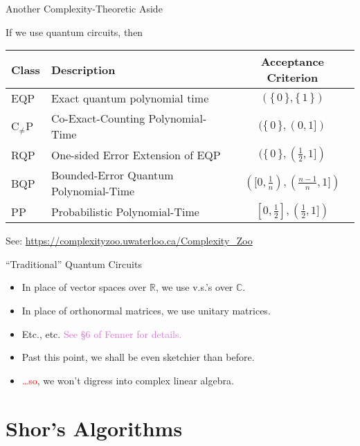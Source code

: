 \documentclass[table,serif,ignorenonframetext,xcolor=dvipsnames]{beamer}
\newcommand{\vertt}[1]{{\textcolor{PineGreen}{#1}}}
\newcommand{\rouge}[1]{{\textcolor{red}{#1}}}
\newcommand{\orchid}[1]{\textcolor{Orchid}{#1}}
\newcommand{\Math}[1]{\ensuremath{#1}}
\newcommand{\Quad}[1]{\hspace*{#1em}}
\newcommand{\set}[1]{\{\,#1\,\}}
\begin{document}
\begin{frame}{Another Complexity-Theoretic Aside}\small

If we use quantum circuits, then 
\begin{center}\begin{tabular}{l|l|c}
{Class} & Description & {Acceptance Criterion } \\ \hline
EQP 
  & {\footnotesize Exact quantum polynomial time} 
  & $(\set{0},\set{1})$ 
  \\
C$_{\not=}$P
  & {\footnotesize Co-Exact-Counting Polynomial-Time} 
  & $(\set{0},(0,1])$ 
  \\
RQP
  & {\footnotesize One-sided Error Extension of EQP} 
  & $(\set{0},(\frac12,1])$
  \\
BQP 
  & {\footnotesize Bounded-Error Quantum Polynomial-Time} 
  & $([0,\frac1n),(\frac{n-1}n,1])$
  \\
PP 
  & {\footnotesize Probabilistic Polynomial-Time} 
  & $[0,\frac12],(\frac12,1])$
\end{tabular}\end{center}

\bigskip
\begin{center}
See: \textcolor{RoyalBlue}{\url{https://complexityzoo.uwaterloo.ca/Complexity_Zoo}}
\end{center}
\end{frame}
\begin{frame}{``Traditional'' Quantum Circuits}


\begin{itemize}
  \item In place of vector spaces over \Math{\mathbb{R}},
  we use v.s.'s over \Math{\mathbb{C}}.
  \item In place of orthonormal matrices, we use
  \vertt{unitary} matrices. 
  \item Etc., etc. \Quad1 \orchid{See \S 6 of Fenner for details.}
\vfill
  \item Past this point, we shall be even sketchier than before.
  \item \rouge{\dots so}, we won't digress into complex
  linear algebra.
\vfill
\end{itemize}

\end{frame}

\section{Shor's Algorithms}
\end{document}

